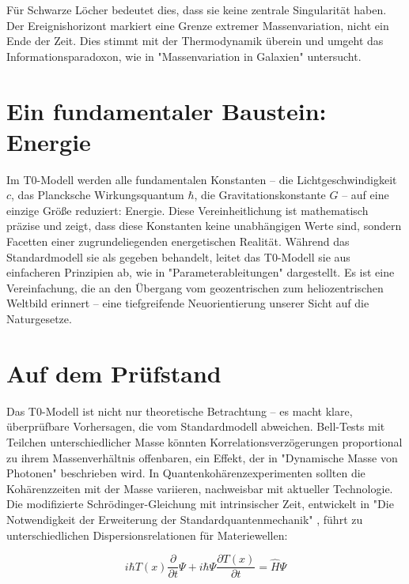 \documentclass[a4paper,12pt]{article}
\newcommand{\Tfield}{T(x)}
\begin{document}
	Für Schwarze Löcher bedeutet dies, dass sie keine zentrale Singularität haben. Der Ereignishorizont markiert eine Grenze extremer Massenvariation, nicht ein Ende der Zeit. Dies stimmt mit der Thermodynamik überein und umgeht das Informationsparadoxon, wie in "Massenvariation in Galaxien" \cite{pascher_galaxies_2025} untersucht.
	
	\section{Ein fundamentaler Baustein: Energie}
	
	Im T0-Modell werden alle fundamentalen Konstanten – die Lichtgeschwindigkeit \(c\), das Plancksche Wirkungsquantum \(\hbar\), die Gravitationskonstante \(G\) – auf eine einzige Größe reduziert: Energie. Diese Vereinheitlichung ist mathematisch präzise und zeigt, dass diese Konstanten keine unabhängigen Werte sind, sondern Facetten einer zugrundeliegenden energetischen Realität. Während das Standardmodell sie als gegeben behandelt, leitet das T0-Modell sie aus einfacheren Prinzipien ab, wie in "Parameterableitungen" \cite{pascher_params_2025} dargestellt. Es ist eine Vereinfachung, die an den Übergang vom geozentrischen zum heliozentrischen Weltbild erinnert – eine tiefgreifende Neuorientierung unserer Sicht auf die Naturgesetze.
	
	\section{Auf dem Prüfstand}
	
	Das T0-Modell ist nicht nur theoretische Betrachtung – es macht klare, überprüfbare Vorhersagen, die vom Standardmodell abweichen. Bell-Tests mit Teilchen unterschiedlicher Masse könnten Korrelationsverzögerungen proportional zu ihrem Massenverhältnis offenbaren, ein Effekt, der in "Dynamische Masse von Photonen" \cite{pascher_photons_2025} beschrieben wird. In Quantenkohärenzexperimenten sollten die Kohärenzzeiten mit der Masse variieren, nachweisbar mit aktueller Technologie. Die modifizierte Schrödinger-Gleichung mit intrinsischer Zeit, entwickelt in "Die Notwendigkeit der Erweiterung der Standardquantenmechanik" \cite{pascher_quantum_2025}, führt zu unterschiedlichen Dispersionsrelationen für Materiewellen:
	
	\begin{equation}
		i\hbar \Tfield \frac{\partial}{\partial t} \Psi + i\hbar \Psi \frac{\partial \Tfield}{\partial t} = \hat{H} \Psi
	\end{equation}
	
\end{document}
